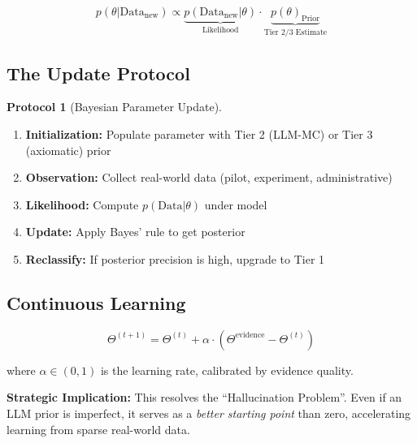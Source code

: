 \documentclass[11pt,a4paper]{article}
\theoremstyle{definition}
\newtheorem{protocol}{Protocol}[section]
\begin{document}
\begin{equation}
p(\theta | \text{Data}_{\text{new}}) \propto \underbrace{p(\text{Data}_{\text{new}} | \theta)}_{\text{Likelihood}} \cdot \underbrace{p(\theta)_{\text{Prior}}}_{\text{Tier 2/3 Estimate}}
\end{equation}

\subsection{The Update Protocol}

\begin{protocol}[Bayesian Parameter Update]
\label{prot:bayesian-update}
\begin{enumerate}
    \item \textbf{Initialization:} Populate parameter with Tier 2 (LLM-MC) or 
    Tier 3 (axiomatic) prior
    \item \textbf{Observation:} Collect real-world data (pilot, experiment, 
    administrative)
    \item \textbf{Likelihood:} Compute $p(\text{Data} | \theta)$ under model
    \item \textbf{Update:} Apply Bayes' rule to get posterior
    \item \textbf{Reclassify:} If posterior precision is high, upgrade to Tier 1
\end{enumerate}
\end{protocol}

\subsection{Continuous Learning}

\begin{equation}
\Theta^{(t+1)} = \Theta^{(t)} + \alpha \cdot (\Theta^{\text{evidence}} - \Theta^{(t)})
\end{equation}

where $\alpha \in (0,1)$ is the learning rate, calibrated by evidence quality.

\textbf{Strategic Implication:} This resolves the ``Hallucination Problem''. 
Even if an LLM prior is imperfect, it serves as a \textit{better starting point} 
than zero, accelerating learning from sparse real-world data.

\end{document}
